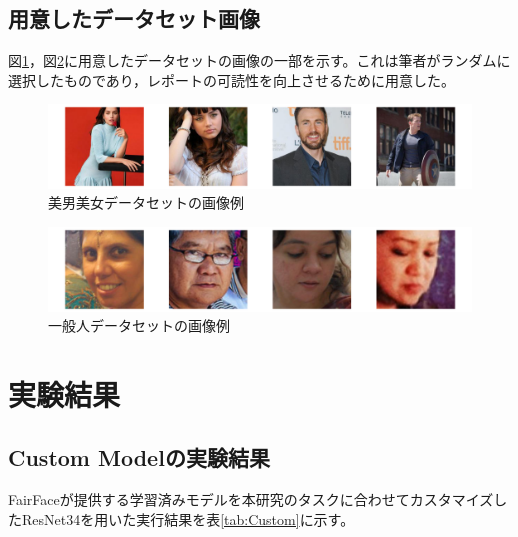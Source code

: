 \documentclass[a4paper,11pt,titlepage]{jsarticle}
\begin{document}
\subsection{用意したデータセット画像}
図\ref{fig:good_ex}，図\ref{fig:normal_ex}に用意したデータセットの画像の一部を示す。これは筆者がランダムに選択したものであり，レポートの可読性を向上させるために用意した。
\begin{figure}[htbp]
    \centering
    \includegraphics[width=1.1\textwidth]{ex_good_dataset.png}
    \caption{美男美女データセットの画像例}
    \label{fig:good_ex}
\end{figure}
\begin{figure}[H]
    \centering
    \includegraphics[width=1.1\textwidth]{ex_normal_dataset.png}
    \caption{一般人データセットの画像例}
    \label{fig:normal_ex}
\end{figure}



\section{実験結果}
\label{label:実験結果}
\subsection{Custom Modelの実験結果}
FairFaceが提供する学習済みモデルを本研究のタスクに合わせてカスタマイズしたResNet34を用いた実行結果を表\ref{tab:Custom}に示す。
\end{document}
